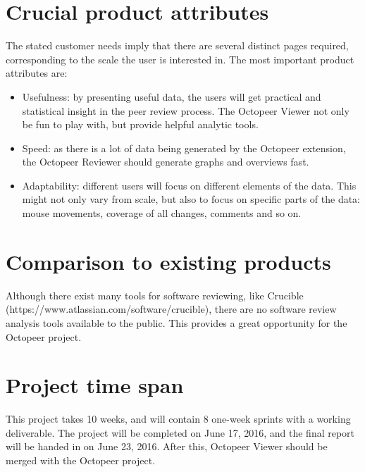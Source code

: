 \documentclass{article}
\begin{document}
\section{Crucial product attributes}
The stated customer needs imply that there are several distinct pages required, corresponding to the scale the user is interested in. The most important product attributes are:
\begin{itemize}
\item Usefulness: by presenting useful data, the users will get practical and statistical insight in the peer review process. The Octopeer Viewer not only be fun to play with, but provide helpful analytic tools.
\item Speed: as there is a lot of data being generated by the Octopeer extension, the Octopeer Reviewer should generate graphs and overviews fast.
\item Adaptability: different users will focus on different elements of the data. This might not only vary from scale, but also to focus on specific parts of the data: mouse movements, coverage of all changes, comments and so on.
\end{itemize}

\section{Comparison to existing products}
Although there exist many tools for software reviewing, like Crucible \\ (https://www.atlassian.com/software/crucible), there are no software review analysis tools available to the public. This provides a great opportunity for the Octopeer project.

\section{Project time span}
This project takes 10 weeks, and will contain 8 one-week sprints with a working deliverable. The project will be completed on June 17, 2016, and the final report will be handed in on June 23, 2016. After this, Octopeer Viewer should be merged with the Octopeer project.


\end{document}
